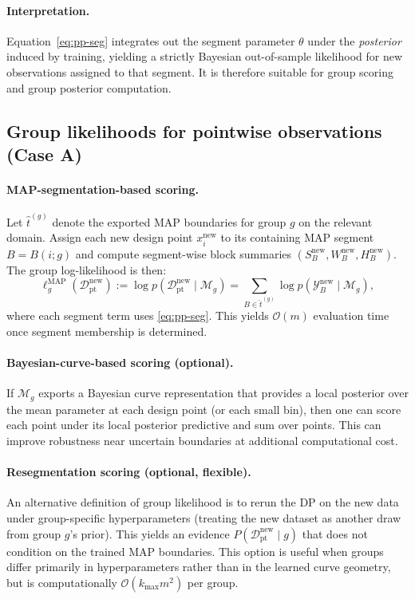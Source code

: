 \paragraph{Interpretation.}
Equation~\eqref{eq:pp-seg} integrates out the segment parameter $\theta$ under the
\emph{posterior} induced by training, yielding a strictly Bayesian out-of-sample likelihood
for new observations assigned to that segment. It is therefore suitable for group scoring
and group posterior computation.

\subsection{Group likelihoods for pointwise observations (Case A)}
\label{sec:group-lik-point}

\paragraph{MAP-segmentation-based scoring.}
Let $\widehat{t}^{(g)}$ denote the exported MAP boundaries for group $g$ on the relevant domain.
Assign each new design point $x_i^{\text{new}}$ to its containing MAP segment $B=B(i;g)$ and
compute segment-wise block summaries $(S_B^{\text{new}},W_B^{\text{new}},H_B^{\text{new}})$.
The group log-likelihood is then:
\begin{equation}
\ell_g^{\text{MAP}}(\mathcal{D}^{\text{new}}_{\text{pt}})
:= \log p(\mathcal{D}^{\text{new}}_{\text{pt}}\mid \mathcal{M}_g)
= \sum_{B\in \widehat{t}^{(g)}} \log p(\mathcal{Y}_B^{\text{new}}\mid \mathcal{M}_g),
\label{eq:group-lik-map}
\end{equation}
where each segment term uses \eqref{eq:pp-seg}. This yields $\mathcal{O}(m)$ evaluation time
once segment membership is determined.

\paragraph{Bayesian-curve-based scoring (optional).}
If $\mathcal{M}_g$ exports a Bayesian curve representation that provides a local posterior over
the mean parameter at each design point (or each small bin), then one can score each point
under its local posterior predictive and sum over points. This can improve robustness near
uncertain boundaries at additional computational cost.

\paragraph{Resegmentation scoring (optional, flexible).}
An alternative definition of group likelihood is to rerun the DP on the new data under
group-specific hyperparameters (treating the new dataset as another draw from group $g$’s
prior). This yields an evidence $P(\mathcal{D}^{\text{new}}_{\text{pt}}\mid g)$ that does not
condition on the trained MAP boundaries. This option is useful when groups differ primarily in
hyperparameters rather than in the learned curve geometry, but is computationally
$\mathcal{O}(k_{\max}m^2)$ per group.

